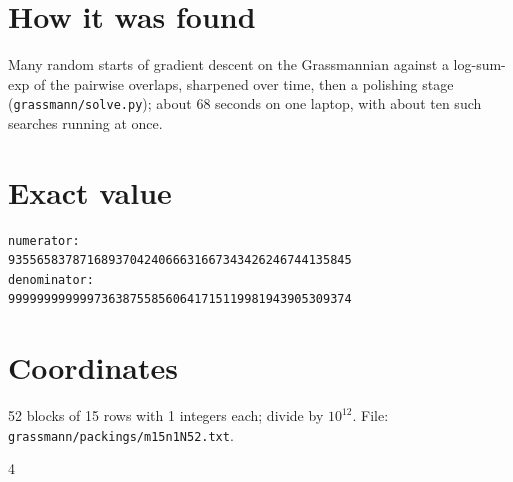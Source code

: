 \documentclass[11pt,a4paper]{article}
\begin{document}
\section{How it was found}
Many random starts of gradient descent on the Grassmannian against a log-sum-exp of the pairwise overlaps, sharpened over time, then a polishing stage (\texttt{grassmann/solve.py}); about 68 seconds on one laptop, with about ten such searches running at once.


\appendix
\section{Exact value}
{\small
\begin{verbatim}
numerator:
935565837871689370424066631667343426246744135845
denominator:
999999999999736387558560641715119981943905309374
\end{verbatim}}

\section{Coordinates}
52 blocks of 15 rows with 1 integers each; divide by $10^{12}$. File: \texttt{grassmann/packings/m15n1N52.txt}.
{\tiny
\begin{multicols}{4}
\end{multicols}}
\end{document}
